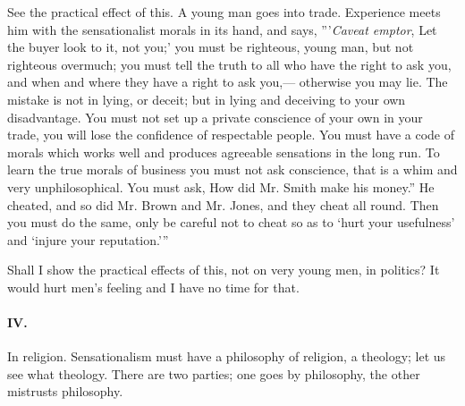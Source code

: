 \documentclass[12pt]{article}
\begin{document}
See the practical effect of this. A young man goes into trade. Experience meets him with the sensationalist morals in its hand, and says, {''}'\emph{Caveat emptor}, Let the buyer look to it, not you;' you must be righteous, young man, but not righteous overmuch; you must tell the truth to all who have the right to ask you, and when and where they have a right to ask you,--- otherwise you may lie. The mistake is not in lying, or deceit; but in lying and deceiving to your own disadvantage. You must not set up a private conscience of your own in your trade, you will lose the confidence of respectable people. You must have a code of morals which works well and produces agreeable sensations in the long run. To learn the true morals of business you must not ask conscience, that is a whim and very unphilosophical. You must ask, How did Mr. Smith make his money.'' He cheated, and so did Mr. Brown and Mr. Jones, and they cheat all round. Then you must do the same, only be careful not to cheat so as to `hurt your usefulness' and `injure your reputation.'{''} 

Shall I show the practical effects of this, not on very young men, in politics? It would hurt men's feeling and I have no time for that. 

\paragraph{IV.} In religion. Sensationalism must have a philosophy of religion, a theology; let us see what theology. There are two parties; one goes by philosophy, the other mistrusts philosophy. 
\end{document}
